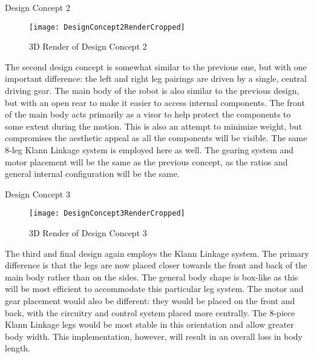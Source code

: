 \begin{homeworkProblem}
\begin{homeworkSection}{Design Concept 2}
\begin{figure}[H]
  \begin{center}
    \texttt{[image: DesignConcept2RenderCropped]}
    \caption{3D Render of Design Concept 2}
    \label{3dConcept2}
  \end{center}
\end{figure}

The second design concept is somewhat similar to the previous one, but with one important difference: the left and right leg pairings are driven by a single, central driving gear. The main body of the robot is also similar to the previous design, but with an open rear to make it easier to access internal components. The front of the main body acts primarily as a visor to help protect the components to some extent during the motion. This is also an attempt to minimize weight, but compromises the aesthetic appeal as all the components will be visible. The same 8-leg Klann Linkage system is employed here as well. The gearing system and motor placement will be the same as the previous concept, as the ratios and general internal configuration will be the same.

\end{homeworkSection}

\begin{homeworkSection}{Design Concept 3}

\begin{figure}[H]
  \begin{center}
    \texttt{[image: DesignConcept3RenderCropped]}
    \caption{3D Render of Design Concept 3}
    \label{3dConcept3}
  \end{center}
\end{figure}

The third and final design again employs the Klann Linkage system. The primary difference is that the legs are now placed closer towards the front and back of the main body rather than on the sides. The general body shape is box-like as this will be most efficient to accommodate this particular leg system. The motor and gear placement would also be different: they would be placed on the front and back, with the circuitry and control system placed more centrally. The 8-piece Klann Linkage legs would be most stable in this orientation and allow greater body width. This implementation, however, will result in an overall loss in body length. 

\end{homeworkSection}
\end{homeworkProblem}

